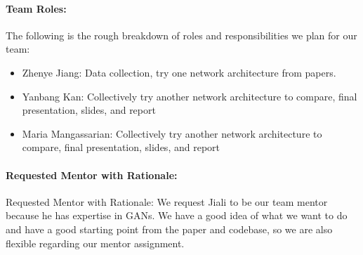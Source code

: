 \documentclass[11pt]{article}
\begin{document}
\paragraph{Team Roles:} The following is the rough breakdown of roles and responsibilities we plan for our team:
\begin{itemize}
\item Zhenye Jiang: Data collection, try one network architecture from papers.
\item Yanbang Kan: Collectively try another network architecture to compare, final presentation, slides, and report
\item Maria Mangassarian: Collectively try another network architecture to compare, final presentation, slides, and report
\end{itemize}

\paragraph{Requested Mentor with Rationale:} Requested Mentor with Rationale: We request Jiali to be our team mentor because he has expertise in GANs. We have a good idea of what we want to do and have a good starting point from the paper and codebase, so we are also flexible regarding our mentor assignment.

 
\end{document}

